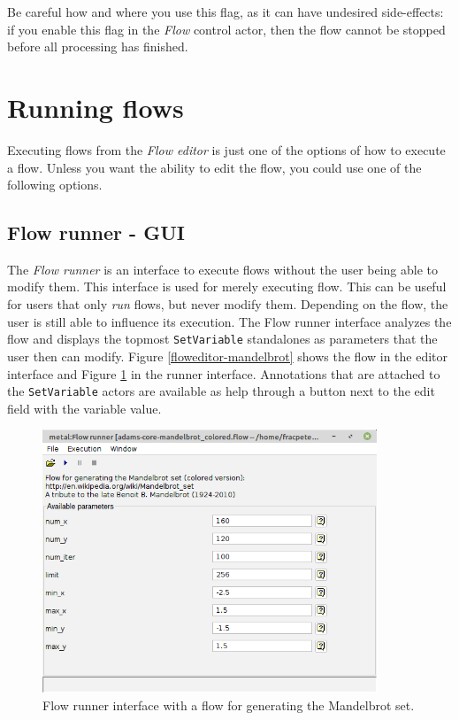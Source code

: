 Be careful how and where you use this flag, as it can have undesired 
side-effects: if you enable this flag in the \textit{Flow} control actor, then 
the flow cannot be stopped before all processing has finished.

\newpage
\section{Running flows}
\label{running_flows}
Executing flows from the \textit{Flow editor} is just one of the options of
how to execute a flow. Unless you want the ability to edit the flow, you could 
use one of the following options.

\subsection{Flow runner - GUI}
The \textit{Flow runner} is an interface to execute flows without the user
being able to modify them. This interface is used for merely executing flow.
This can be useful for users that only \textit{run} flows, but never modify
them. Depending on the flow, the user is still able to influence its 
execution. The Flow runner interface analyzes the flow and displays the 
topmost \texttt{SetVariable} standalones as parameters that the user then
can modify. Figure \ref{floweditor-mandelbrot} shows the flow in the editor
interface and Figure \ref{flowrunner-mandelbrot} in the runner interface.
Annotations that are attached to the \texttt{SetVariable} actors are available
as help through a button next to the edit field with the variable value.

\begin{figure}[htb]
  \centering
  \includegraphics[width=10.0cm]{images/flowrunner-mandelbrot.png}
  \caption{Flow runner interface with a flow for generating the Mandelbrot set.}
  \label{flowrunner-mandelbrot}
\end{figure}

